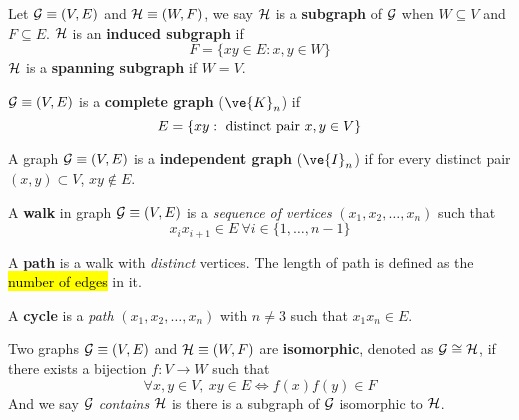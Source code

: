 \documentclass{article}
\begin{document}
		\begin{definition}
			Let $\mathcal{{G}} \equiv (V, E)$ and $\mathcal{{H}} \equiv (W, F)$, we say $\mathcal{{H}}$ is a \textbf{subgraph} of $\mathcal{{G}}$ when $W \subseteq V$ and $F \subseteq E$. $\mathcal{{H}}$ is an \textbf{induced subgraph} if
			\begin{equation}
				F = \{xy \in E: x, y \in W\}	
			\end{equation}
			$\mathcal{{H}}$ is a \textbf{spanning subgraph} if $W = V$.
		\end{definition}
		
		\begin{definition}
			$\mathcal{{G}} \equiv (V, E)$ is a \textbf{complete graph} ($\ve{K}_n$) if 
			\begin{equation}
				E = \{xy: \text{{ distinct pair }} x, y \in V\}
			\end{equation}
		\end{definition}
		
		\begin{definition}
			A graph $\mathcal{{G}} \equiv (V, E)$ is a \textbf{independent graph} ($\ve{I}_n$) if for every distinct pair $(x, y) \subset V$, $xy \notin E$.
		\end{definition}
		
		\begin{definition}
			A \textbf{walk} in graph $\mathcal{{G}} \equiv (V, E)$ is a \emph{sequence of vertices} $(x_1, x_2, \dots, x_n)$ such that 
			\begin{equation}
				x_ix_{i+1} \in E\  \forall i \in \{1,\dots,n-1\}
			\end{equation}
		\end{definition}
		
		\begin{definition}
			A \textbf{path} is a walk with \emph{distinct} vertices. The length of path is defined as the \hl{number of edges} in it.
		\end{definition}
		
		\begin{definition}
			A \textbf{cycle} is a \emph{path} $(x_1, x_2, \dots, x_n)$ with $n \neq 3$ such that $x_1x_n \in E$.
		\end{definition}
		
		\begin{definition}
			Two graphs $\mathcal{{G}} \equiv (V, E)$ and $\mathcal{{H}} \equiv (W, F)$ are \textbf{isomorphic}, denoted as $\mathcal{{G}} \cong \mathcal{{H}}$, if there exists a bijection $f: V \to W$ such that
			\begin{equation}
				\forall x, y \in V,\ xy \in E \iff f(x)f(y) \in F
			\end{equation}
			And we say $\mathcal{{G}}$ \emph{contains} $\mathcal{{H}}$ is there is a subgraph of $\mathcal{{G}}$ isomorphic to $\mathcal{{H}}$.
		\end{definition}
		
\end{document}
